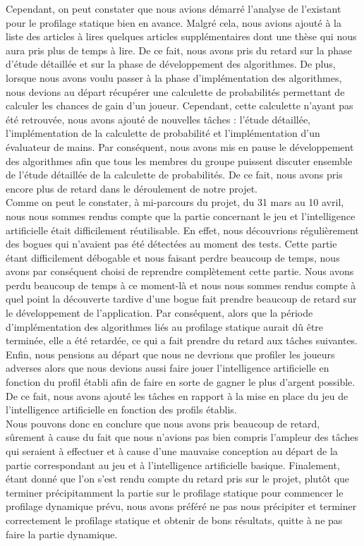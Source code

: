 \documentclass{report}
\begin{document}
Cependant, on peut constater que nous avions démarré l'analyse de l'existant pour le profilage statique bien en avance. Malgré cela, nous avions ajouté à la liste des articles à lires quelques articles supplémentaires dont une thèse qui nous aura pris plus de temps à lire. De ce fait, nous avons pris du retard sur la phase d'étude détaillée et sur la phase de développement des algorithmes. De plus, lorsque nous avons voulu passer à la phase d'implémentation des algorithmes, nous devions au départ récupérer une calculette de probabilités permettant de calculer les chances de gain d'un joueur. Cependant, cette calculette n'ayant pas été retrouvée, nous avons ajouté de nouvelles tâches : l'étude détaillée, l'implémentation de la calculette de probabilité et l'implémentation d'un évaluateur de mains. Par conséquent, nous avons mis en pause le développement des algorithmes afin que tous les membres du groupe puissent discuter ensemble de l'étude détaillée de la calculette de probabilités. De ce fait, nous avons pris encore plus de retard dans le déroulement de notre projet. \\

Comme on peut le constater, à mi-parcours du projet, du 31 mars au 10 avril, nous nous sommes rendus compte que la partie concernant le jeu et l'intelligence artificielle était difficilement réutilisable. En effet, nous découvrions régulièrement des bogues qui n'avaient pas été détectées au moment des tests. Cette partie étant difficilement débogable et nous faisant perdre beaucoup de temps, nous avons par conséquent choisi de reprendre complètement cette partie. Nous avons perdu beaucoup de temps à ce moment-là et nous nous sommes rendus compte à quel point la découverte tardive d'une bogue fait prendre beaucoup de retard sur le développement de l'application. Par conséquent, alors que la période d'implémentation des algorithmes liés au profilage statique aurait dû être terminée, elle a été retardée, ce qui a fait prendre du retard aux tâches suivantes.\\

Enfin, nous pensions au départ que nous ne devrions que profiler les joueurs adverses alors que nous devions aussi faire jouer l'intelligence artificielle en fonction du profil établi afin de faire en sorte de gagner le plus d'argent possible. De ce fait, nous avons ajouté les tâches en rapport à la mise en place du jeu de l'intelligence artificielle en fonction des profils établis. \\

Nous pouvons donc en conclure que nous avons pris beaucoup de retard, sûrement à cause du fait que nous n'avions pas bien compris l'ampleur des tâches qui seraient à effectuer et à cause d'une mauvaise conception au départ de la partie correspondant au jeu et à l'intelligence artificielle basique. Finalement, étant donné que l'on s'est rendu compte du retard pris sur le projet, plutôt que terminer précipitamment la partie sur le profilage statique pour commencer le profilage dynamique prévu, nous avons préféré ne pas nous précipiter et terminer correctement le profilage statique et obtenir de bons résultats, quitte à ne pas faire la partie dynamique. \par
\end{document}
